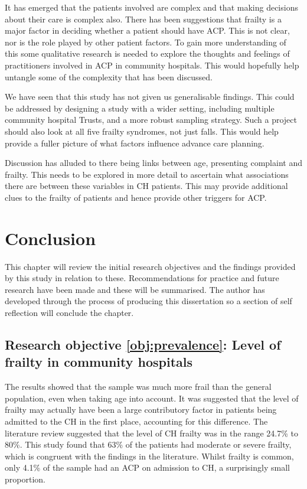 \documentclass
[
	12pt,
	a4paper,
	oneside,
]{report}
\begin{document}
It has emerged that the patients involved are complex and that making decisions
about their care is complex also. There has been suggestions that frailty is 
a major factor in deciding whether a patient should have ACP. This is not
clear, nor is the role played by other patient factors. To gain more 
understanding of this some qualitative research is needed 
to explore the thoughts and feelings of practitioners involved in ACP in
community hospitals. This would hopefully help untangle some of the complexity
that has been discussed.

We have seen that this study has not given us generalisable findings. This
could be addressed by designing a study with a wider setting, including
multiple community hospital Trusts, and a more robust sampling strategy. 
Such a project should
also look at all five frailty syndromes, not just falls. This would help
provide a fuller picture of what factors influence advance care planning.

Discussion has alluded to there being links between age, presenting 
complaint and frailty. This needs to be explored in more detail to
ascertain what associations there are between these variables in CH patients.
This may provide additional clues to the frailty of patients and hence
provide other triggers for ACP.

\chapter{Conclusion}

This chapter will review the initial research objectives and the findings
provided by this study in relation to these. 
Recommendations for practice and future research have been made and these 
will be summarised.
The author
has developed through the process of producing this dissertation so a section
of self reflection will conclude the chapter.

\section{Research objective \ref{obj:prevalence}: Level of frailty in
	community hospitals}

The results showed that the sample was much more frail than the general
population, even when taking age into account. It was suggested that the level
of frailty may actually have been a large contributory factor in patients
being admitted to the CH in the first place, accounting for this difference.
The literature review suggested that the level of CH frailty was in the range 
24.7\% to 80\%. This study found that 63\% of the patients had moderate or
severe frailty, which is congruent with the findings in the literature. Whilst
frailty is common, only 4.1\% of the sample had an ACP on admission to CH, a
surprisingly small proportion.
\end{document}
